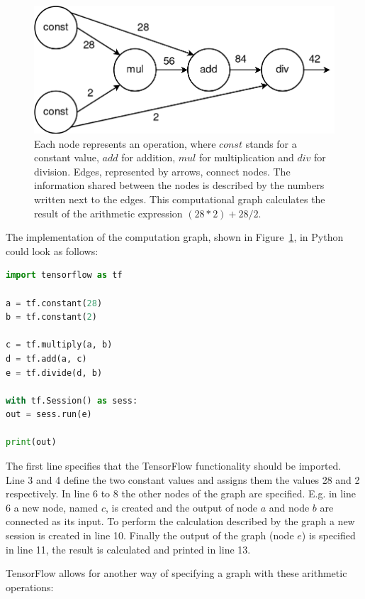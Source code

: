 \begin{figure}[h!]
	\centering
	\includegraphics[width=4.5in]{img/methodology_tensorflow_computationGraph.png}
	\caption{Each node represents an operation, where $const$ stands for a constant value, $add$ for addition, $mul$ for multiplication and $div$ for division. Edges, represented by arrows, connect nodes. The information shared between the nodes is described by the numbers written next to the edges. This computational graph calculates the result of the arithmetic expression $(28 * 2) + 28 / 2$.}
	\label{pic:methodology_tensorflow_computationGraph}
\end{figure}

The implementation of the computation graph, shown in Figure~\ref{pic:methodology_tensorflow_computationGraph}, in Python could look as follows:

\begin{lstlisting}[language=python]
import tensorflow as tf

a = tf.constant(28)
b = tf.constant(2)

c = tf.multiply(a, b)
d = tf.add(a, c)
e = tf.divide(d, b)

with tf.Session() as sess:
out = sess.run(e)

print(out)
\end{lstlisting}

The first line specifies that the TensorFlow functionality should be imported. Line 3 and 4 define the two constant values and assigns them the values 28 and 2 respectively. In line 6 to 8 the other nodes of the graph are specified. E.g. in line 6 a new node, named $c$, is created and the output of node $a$ and node $b$ are connected as its input. To perform the calculation described by the graph a new session is created in line 10. Finally the output of the graph (node $e$) is specified in line 11, the result is calculated and printed in line 13.

TensorFlow allows for another way of specifying a graph with these arithmetic operations:

